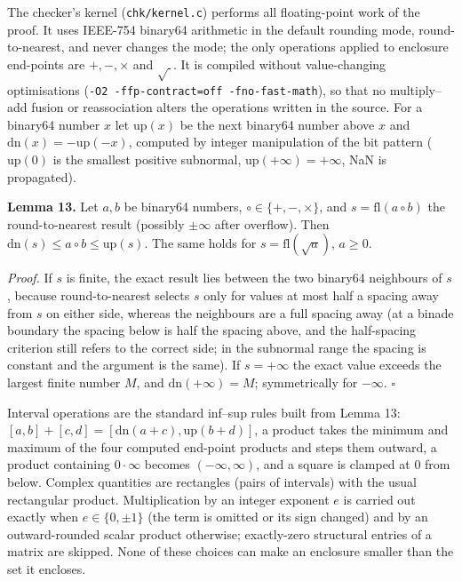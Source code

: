 \documentclass[
  11pt,
]{article}
\begin{document}
The checker's kernel (\texttt{chk/kernel.c}) performs all floating-point
work of the proof. It uses IEEE-754 binary64 arithmetic in the default
rounding mode, round-to-nearest, and never changes the mode; the only
operations applied to enclosure end-points are \(+,-,\times\) and
\(\sqrt{\ }\). It is compiled without value-changing optimisations
(\texttt{-O2\ -ffp-contract=off\ -fno-fast-math}), so that no
multiply--add fusion or reassociation alters the operations written in
the source. For a binary64 number \(x\) let \(\mathrm{up}(x)\) be the
next binary64 number above \(x\) and
\(\mathrm{dn}(x)=-\mathrm{up}(-x)\), computed by integer manipulation of
the bit pattern (\(\mathrm{up}(0)\) is the smallest positive subnormal,
\(\mathrm{up}(+\infty)=+\infty\), NaN is propagated).

\textbf{Lemma 13.} Let \(a,b\) be binary64 numbers,
\(\circ\in\{+,-,\times\}\), and \(s=\mathrm{fl}(a\circ b)\) the
round-to-nearest result (possibly \(\pm\infty\) after overflow). Then
\(\mathrm{dn}(s)\le a\circ b\le\mathrm{up}(s)\). The same holds for
\(s=\mathrm{fl}(\sqrt a)\), \(a\ge0\).

\emph{Proof.} If \(s\) is finite, the exact result lies between the two
binary64 neighbours of \(s\), because round-to-nearest selects \(s\)
only for values at most half a spacing away from \(s\) on either side,
whereas the neighbours are a full spacing away (at a binade boundary the
spacing below is half the spacing above, and the half-spacing criterion
still refers to the correct side; in the subnormal range the spacing is
constant and the argument is the same). If \(s=+\infty\) the exact value
exceeds the largest finite number \(M\), and \(\mathrm{dn}(+\infty)=M\);
symmetrically for \(-\infty\). \(\square\)

Interval operations are the standard inf--sup rules built from Lemma 13:
\([a,b]+[c,d]=[\mathrm{dn}(a+c),\mathrm{up}(b+d)]\), a product takes the
minimum and maximum of the four computed end-point products and steps
them outward, a product containing \(0\cdot\infty\) becomes
\((-\infty,\infty)\), and a square is clamped at \(0\) from below.
Complex quantities are rectangles (pairs of intervals) with the usual
rectangular product. Multiplication by an integer exponent \(e\) is
carried out exactly when \(e\in\{0,\pm1\}\) (the term is omitted or its
sign changed) and by an outward-rounded scalar product otherwise;
exactly-zero structural entries of a matrix are skipped. None of these
choices can make an enclosure smaller than the set it encloses.
\end{document}
